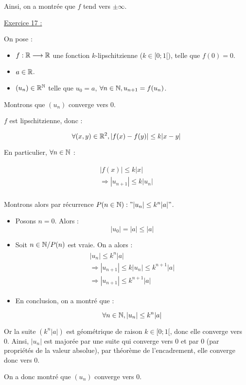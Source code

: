 \documentclass{article}
\begin{document}
Ainsi, on a montrée que $f$ tend vers $\pm\infty$.

\bigskip
\bigskip
\bigskip

\underline{Exercice 17 :}

On pose :

\begin{itemize}
    \item $f:\mathbb{R}\longrightarrow\mathbb{R}$ une fonction $k$-lipschitzienne ($k\in[0;1[$), telle que $f(0)=0$.
    \item $a\in\mathbb{R}$.
    \item $(u_n)\in\mathbb{R}^{\mathbb{N}}$ telle que $u_0=a$, $\forall n\in\mathbb{N}, u_{n+1}=f(u_n)$.
\end{itemize}

Montrons que $(u_n)$ converge vers 0.

\bigskip
\bigskip
\bigskip
\bigskip

$f$ est lipschitzienne, donc :

$$\forall(x, y)\in\mathbb{R}^2, |f(x)-f(y)|\leq k|x-y|$$

En particulier, $\forall n\in\mathbb{N}$ :

\begin{align*}\begin{split}
|f(x)|\leq k|x|\\
\Longrightarrow |u_{n+1}|\leq k|u_n|\\
\end{split}\end{align*}

\bigskip

Montrons alors par récurrence $P(n\in\mathbb{N}):"|u_n|\leq k^n |a|"$.

\begin{itemize}
    \item Posons $n=0$. Alors :
    $$|u_0|=|a| \leq |a|$$

    \item Soit $n\in\mathbb{N}/P(n)$ est vraie. On a alors :
    \begin{align*}\begin{split}
        |u_n|\leq k^n|a|\\
        \Longrightarrow |u_{n+1}|\leq k|u_n| \leq k^{n+1} |a|\\
        \Longrightarrow \boxed{|u_{n+1}|\leq k^{n+1}|a|}
    \end{split}\end{align*}

    \item En conclusion, on a montré que :
    
    $$\forall n\in\mathbb{N}, |u_n|\leq k^n|a|$$
\end{itemize}

Or la suite $(k^n|a|)$ est géométrique de raison $k\in[0;1[$, donc elle converge vers 0. Ainsi, $|u_n|$ est majorée par une suite qui converge vers 0 et par 0 (par propriétés de la valeur absolue), par théorème de l'encadrement, elle converge donc vers 0.

\bigskip

On a donc montré que $(u_n)$ converge vers 0.
\end{document}
